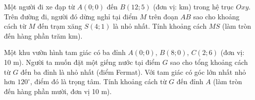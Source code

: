 \begin{bt}%
	Một người đi xe đạp từ $A(0;0)$ đến $B(12;5)$ (đơn vị: km) trong hệ trục $Oxy$. Trên đường đi, người đó dừng nghỉ tại điểm $M$ trên đoạn $AB$ sao cho khoảng cách từ $M$ đến trạm xăng $S(4;1)$ là nhỏ nhất. Tính khoảng cách $MS$ (làm tròn đến hàng phần trăm km).
	
\end{bt}

\begin{bt}%
	Một khu vườn hình tam giác có ba đỉnh $A(0;0)$, $B(8;0)$, $C(2;6)$ (đơn vị: 10 m). Người ta muốn đặt một giếng nước tại điểm $G$ sao cho tổng khoảng cách từ $G$ đến ba đỉnh là nhỏ nhất (điểm Fermat). Với tam giác có góc lớn nhất nhỏ hơn $120^\circ$, điểm đó là trọng tâm. Tính khoảng cách từ $G$ đến đỉnh $A$ (làm tròn đến hàng phần mười, đơn vị 10 m).
	
\end{bt}

